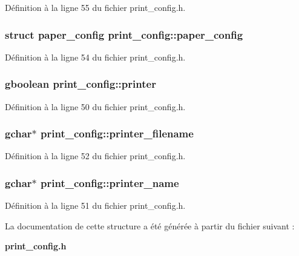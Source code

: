 Définition à la ligne 55 du fichier print\_\-config.h.

\subsubsection[{paper\_\-config}]{\setlength{\rightskip}{0pt plus 5cm}struct {\bf paper\_\-config} {\bf print\_\-config::paper\_\-config}}\label{structprint__config_a2754d52dcff250f2c78fdcd9267a704e}


Définition à la ligne 54 du fichier print\_\-config.h.

\subsubsection[{printer}]{\setlength{\rightskip}{0pt plus 5cm}gboolean {\bf print\_\-config::printer}}\label{structprint__config_a027ac5045394b5ec477942f0295f9e3d}


Définition à la ligne 50 du fichier print\_\-config.h.

\subsubsection[{printer\_\-filename}]{\setlength{\rightskip}{0pt plus 5cm}gchar$\ast$ {\bf print\_\-config::printer\_\-filename}}\label{structprint__config_a5f0f0798f348098e208f067cedf6aa0d}


Définition à la ligne 52 du fichier print\_\-config.h.

\subsubsection[{printer\_\-name}]{\setlength{\rightskip}{0pt plus 5cm}gchar$\ast$ {\bf print\_\-config::printer\_\-name}}\label{structprint__config_a56cb345559847edcf39fdc6bdd3621eb}


Définition à la ligne 51 du fichier print\_\-config.h.



La documentation de cette structure a été générée à partir du fichier suivant :\begin{DoxyCompactItemize}
\item 
{\bf print\_\-config.h}\end{DoxyCompactItemize}
